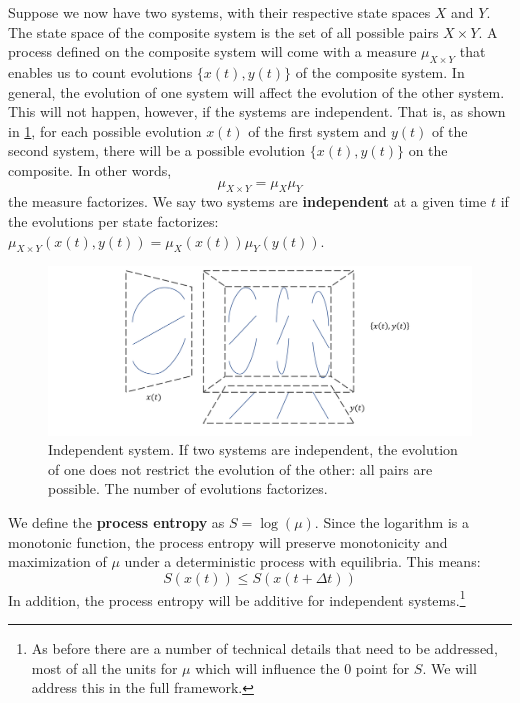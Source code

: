 \documentclass[letterpaper,twocolumn]{article}
\begin{document}
Suppose we now have two systems, with their respective state spaces $X$ and $Y$. The state space of the composite system is the set of all possible pairs $X \times Y$. A process defined on the composite system will come with a measure $\mu_{X \times Y}$ that enables us to count evolutions $\{x(t), y(t)\}$ of the composite system. In general, the evolution of one system will affect the evolution of the other system. This will not happen, however, if the systems are independent. That is, as shown in \ref{fig_independence}, for each possible evolution $x(t)$ of the first system and $y(t)$ of the second system, there will be a possible evolution $\{x(t), y(t)\}$ on the composite. In other words,
\begin{equation}
	\mu_{X \times Y} = \mu_X \mu_Y
\end{equation}
the measure factorizes. We say two systems are \textbf{independent} at a given time $t$ if the evolutions per state factorizes: $\mu_{X \times Y}(x(t), y(t)) = \mu_X (x(t)) \mu_Y (y(t))$.

\begin{figure}[h]
	\includegraphics[width=\columnwidth]{images/Slide7.png}
	\caption{Independent system. If two systems are independent, the evolution of one does not restrict the evolution of the other: all pairs are possible. The number of evolutions factorizes.}\label{fig_independence}
\end{figure}

We define the \textbf{process entropy} as $S = \log(\mu)$. Since the logarithm is a monotonic function, the process entropy will preserve monotonicity and maximization of $\mu$ under a deterministic process with equilibria. This means:
\begin{equation}\label{ov_entropy_increases}
S(x(t)) \leq S(x(t + \Delta t))
\end{equation}
In addition, the process entropy will be additive for independent systems.\footnote{As before there are a number of technical details that need to be addressed, most of all the units for $\mu$ which will influence the 0 point for $S$. We will address this in the full framework.}
\end{document}
